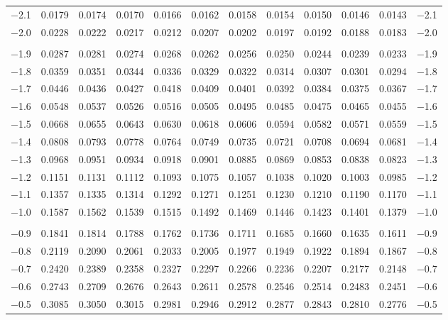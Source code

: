 \documentclass[12pt]{article}
\begin{document}
\begin{landscape}
\begin{adjustbox}{angle=270}
\begin{tabular}{r@{\hspace{4.5mm}}
	*5{c @{\hspace{2.5mm}}}@{\hspace{-0.5mm}}*5{@{\hspace{2.5mm}}c}@{\hspace{2mm}}r}
$-$2.1 & 0.0179 & 0.0174 & 0.0170 & 0.0166 & 0.0162 & 0.0158 & 0.0154 & 0.0150 & 0.0146 & 0.0143 & $-$2.1 \\
$-$2.0 & 0.0228 & 0.0222 & 0.0217 & 0.0212 & 0.0207 & 0.0202 & 0.0197 & 0.0192 & 0.0188 & 0.0183 & $-$2.0 \\
&&&&&&&&&&{} \\
$-$1.9 & 0.0287 & 0.0281 & 0.0274 & 0.0268 & 0.0262 & 0.0256 & 0.0250 & 0.0244 & 0.0239 & 0.0233 & $-$1.9 \\
$-$1.8 & 0.0359 & 0.0351 & 0.0344 & 0.0336 & 0.0329 & 0.0322 & 0.0314 & 0.0307 & 0.0301 & 0.0294 & $-$1.8 \\
$-$1.7 & 0.0446 & 0.0436 & 0.0427 & 0.0418 & 0.0409 & 0.0401 & 0.0392 & 0.0384 & 0.0375 & 0.0367 & $-$1.7 \\
$-$1.6 & 0.0548 & 0.0537 & 0.0526 & 0.0516 & 0.0505 & 0.0495 & 0.0485 & 0.0475 & 0.0465 & 0.0455 & $-$1.6 \\
$-$1.5 & 0.0668 & 0.0655 & 0.0643 & 0.0630 & 0.0618 & 0.0606 & 0.0594 & 0.0582 & 0.0571 & 0.0559 & $-$1.5 \\
$-$1.4 & 0.0808 & 0.0793 & 0.0778 & 0.0764 & 0.0749 & 0.0735 & 0.0721 & 0.0708 & 0.0694 & 0.0681 & $-$1.4 \\
$-$1.3 & 0.0968 & 0.0951 & 0.0934 & 0.0918 & 0.0901 & 0.0885 & 0.0869 & 0.0853 & 0.0838 & 0.0823 & $-$1.3 \\
$-$1.2 & 0.1151 & 0.1131 & 0.1112 & 0.1093 & 0.1075 & 0.1057 & 0.1038 & 0.1020 & 0.1003 & 0.0985 & $-$1.2 \\
$-$1.1 & 0.1357 & 0.1335 & 0.1314 & 0.1292 & 0.1271 & 0.1251 & 0.1230 & 0.1210 & 0.1190 & 0.1170 & $-$1.1 \\
$-$1.0 & 0.1587 & 0.1562 & 0.1539 & 0.1515 & 0.1492 & 0.1469 & 0.1446 & 0.1423 & 0.1401 & 0.1379 & $-$1.0 \\
&&&&&&&&&&{} \\
$-$0.9 & 0.1841 & 0.1814 & 0.1788 & 0.1762 & 0.1736 & 0.1711 & 0.1685 & 0.1660 & 0.1635 & 0.1611 & $-$0.9 \\
$-$0.8 & 0.2119 & 0.2090 & 0.2061 & 0.2033 & 0.2005 & 0.1977 & 0.1949 & 0.1922 & 0.1894 & 0.1867 & $-$0.8 \\
$-$0.7 & 0.2420 & 0.2389 & 0.2358 & 0.2327 & 0.2297 & 0.2266 & 0.2236 & 0.2207 & 0.2177 & 0.2148 & $-$0.7 \\
$-$0.6 & 0.2743 & 0.2709 & 0.2676 & 0.2643 & 0.2611 & 0.2578 & 0.2546 & 0.2514 & 0.2483 & 0.2451 & $-$0.6 \\
$-$0.5 & 0.3085 & 0.3050 & 0.3015 & 0.2981 & 0.2946 & 0.2912 & 0.2877 & 0.2843 & 0.2810 & 0.2776 & $-$0.5 \\

\end{tabular}
\end{adjustbox}
\end{landscape}
\end{document}
